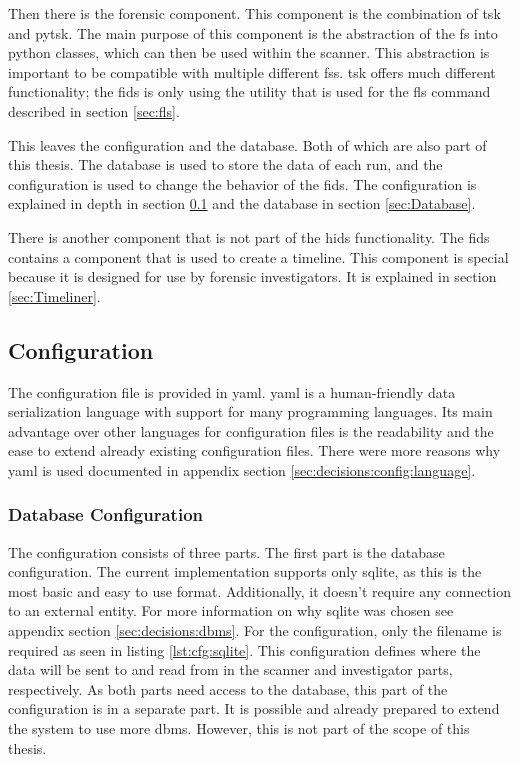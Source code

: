 Then there is the forensic component. This component is the combination of \gls{tsk} and \gls{pytsk}. The main purpose of this component is the abstraction of the \gls{fs} into python classes, which can then be used within the scanner. This abstraction is important to be compatible with multiple different \glspl{fs}. \gls{tsk} offers much different functionality; the \gls{fids} is only using the utility that is used for the fls command described in section \ref{sec:fls}. 

This leaves the configuration and the database. Both of which are also part of this thesis. The database is used to store the data of each run, and the configuration is used to change the behavior of the \gls{fids}. The configuration is explained in depth in section \ref{sec:Configuration} and the database in section \ref{sec:Database}.

There is another component that is not part of the \gls{hids} functionality. The \gls{fids} contains a component that is used to create a timeline. This component is special because it is designed for use by forensic investigators. It is explained in section \ref{sec:Timeliner}.

\subsection{Configuration}
\label{sec:Configuration}

The configuration file is provided in \gls{yaml}. \gls{yaml} is a human-friendly data serialization language with support for many programming languages. Its main advantage over other languages for configuration files is the readability and the ease to extend already existing configuration files. There were more reasons why \gls{yaml} is used documented in appendix section \ref{sec:decisions:config:language}.

\subsubsection{Database Configuration}

The configuration consists of three parts. The first part is the database configuration. The current implementation supports only \gls{sqlite}, as this is the most basic and easy to use format. Additionally, it doesn't require any connection to an external entity. For more information on why \gls{sqlite} was chosen see appendix section \ref{sec:decisions:dbms}. For the configuration, only the filename is required as seen in listing \ref{lst:cfg:sqlite}. This configuration defines where the data will be sent to and read from in the scanner and investigator parts, respectively. As both parts need access to the database, this part of the configuration is in a separate part. It is possible and already prepared to extend the system to use more \gls{dbms}. However, this is not part of the scope of this thesis.

